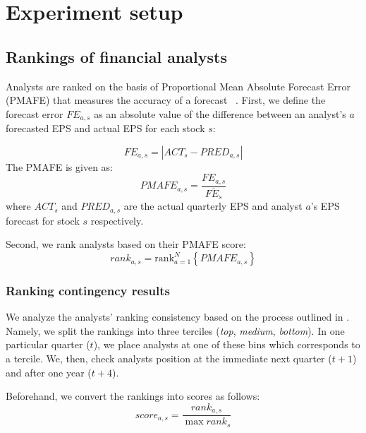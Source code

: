\documentclass[a4paper,12pt,openright,notitlepage]{report}\usepackage[]{graphicx}\usepackage[]{color}
\begin{document}
\section{Experiment setup}
\label{ch3-sec:exp_setup}
\subsection{Rankings of financial analysts}
\label{ch3:eps-rank}
Analysts are ranked on the basis of Proportional Mean Absolute Forecast Error (PMAFE) that measures the accuracy of a forecast ~\citep{clement1999,brown2001,ertimur2007}. First,  we define the forecast  error  $FE_{a,s}$ as an absolute value of the difference between an analyst's $a$ forecasted EPS  and actual EPS for each stock $s$:

\begin{equation}
FE_{a,s}=|{ACT_{s}-PRED_{a,s}}|
\end{equation}
The PMAFE is given as:
\begin{equation}
PMAFE_{a,s}= \frac{FE_{a,s}}{\overline{FE_{s}}}
\end{equation}
where $ACT_{s}$ and $PRED_{a,s}$ are the actual quarterly EPS and  analyst $a$'s EPS forecast for stock $s$ respectively.

Second, we rank analysts based on their PMAFE score:
\begin{equation}
\label{ch3-eps:rank}
rank_{a,s}=\mathrm{rank}_{a=1}^{N} \left\{ PMAFE_{a,s} \right\}
\end{equation}



\subsubsection{Ranking contingency results}
\label{ch3-tab:rank-contin}

We analyze the analysts' ranking consistency based on the process outlined in \cite{aiguzhinov2015a}.  Namely, we split the rankings into three terciles (\textit{top}, \textit{medium}, \textit{bottom}). In one particular quarter ($t$), we place  analysts at one of these bins which corresponds to a tercile. We, then,  check analysts position at the immediate next quarter ($t+1$) and after one year ($t+4$).

Beforehand, we convert the rankings into scores as follows:
\begin{equation}
\label{ch3-eq:score}
score_{a,s}=\frac{rank_{a,s}}{\max{rank_s}}
\end{equation}
\end{document}
